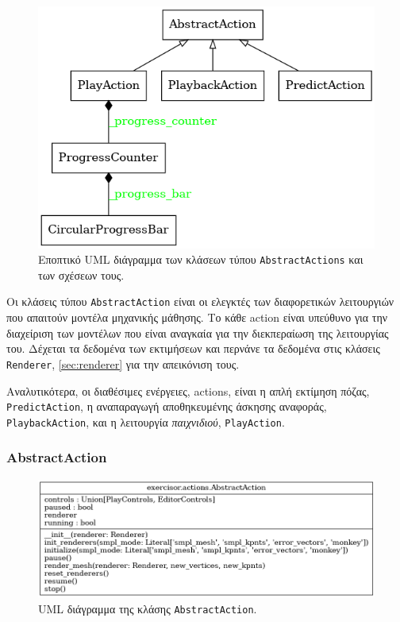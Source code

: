 \begin{figure}[h]
	\centering
	\includegraphics[scale=0.7]{images/chapter5/actions_overview.png}
	\caption{Εποπτικό UML διάγραμμα των κλάσεων τύπου \texttt{AbstractActions} και των σχέσεων τους.}
	\label{fig:actions_overview}
\end{figure}

Οι κλάσεις τύπου \texttt{AbstractAction} είναι οι ελεγκτές των διαφορετικών λειτουργιών που απαιτούν μοντέλα μηχανικής μάθησης. Το κάθε action είναι υπεύθυνο για την διαχείριση των μοντέλων που είναι αναγκαία για την διεκπεραίωση της λειτουργίας του. Δέχεται τα δεδομένα των εκτιμήσεων και περνάνε τα δεδομένα στις κλάσεις \texttt{Renderer}, \ref{sec:renderer} για την απεικόνιση τους.

Αναλυτικότερα, οι διαθέσιμες ενέργειες, actions, είναι η απλή εκτίμηση πόζας, \texttt{PredictAction}, η αναπαραγωγή αποθηκευμένης άσκησης αναφοράς, \texttt{PlaybackAction}, και η λειτουργία \textsl{παιχνιδιού}, \texttt{PlayAction}.


\subsubsection{AbstractAction}

\begin{figure}[H]
	\centering
	\includegraphics[scale=0.5]{images/chapter5/abstract_action_uml.png}
	\caption{UML διάγραμμα της κλάσης \texttt{AbstractAction}.}
	\label{fig:abstract_action}
\end{figure}


